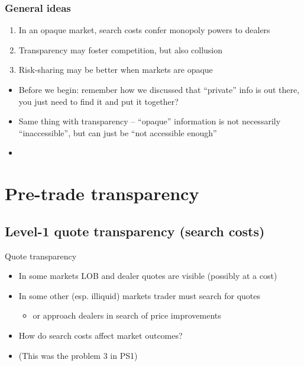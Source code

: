 \documentclass[english,10pt
,aspectratio=169
]{beamer}
\begin{document}
\begin{frame}[label=ideas]
	\frametitle{General ideas}
	\begin{enumerate}
		\item In an opaque market, search costs confer monopoly powers to dealers
		\item Transparency may foster competition, but also collusion
		\item Risk-sharing may be better when markets are opaque
	\end{enumerate}
	
	\bigskip\pause 
	\begin{itemize}
		\item Before we begin: remember how we discussed that ``private'' info is out there, you just need to find it and put it together?
		\item Same thing with transparency -- ``opaque'' information is not necessarily ``inaccessible'', but can just be ``not accessible enough''
		\item \hyperlink{example}{}
	\end{itemize}
\end{frame}



\section{Pre-trade transparency}

\subsection{Level-1 quote transparency (search costs)}

\begin{frame}{Quote transparency}
	\begin{itemize}
		\item In some markets LOB and dealer quotes are visible (possibly at a cost)
		\item In some other (esp. illiquid) markets trader must search for quotes 
		\begin{itemize}
			\item or approach dealers in search of price improvements
		\end{itemize}
		\item How do \alert{search costs} affect market outcomes?
		\item (This was the problem 3 in PS1)
	\end{itemize}
\end{frame}
\end{document}
